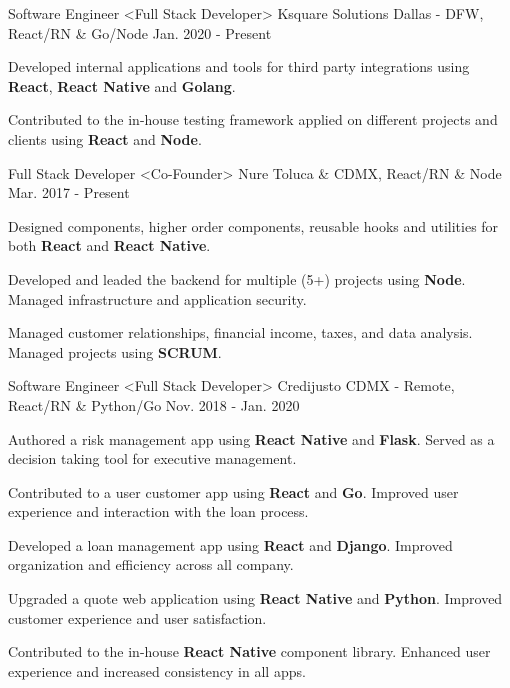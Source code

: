 \begin{cventries}
  \cventry
    {Software Engineer <Full Stack Developer>}
    {Ksquare Solutions}
    {Dallas - DFW, React/RN \& Go/Node}
    {Jan. 2020 - Present}
    {
      \begin{cvitems}
        \item {Developed internal applications and tools for third party integrations using \textbf{React}, \textbf{React Native} and \textbf{Golang}.}
        \item {Contributed to the in-house testing framework applied on different projects and clients using \textbf{React} and \textbf{Node}.}
      \end{cvitems}
    }
  \cventry
    {Full Stack Developer <Co-Founder>}
    {Nure}
    {Toluca \& CDMX, React/RN \& Node}
    {Mar. 2017 - Present}
    {
      \begin{cvitems}
        \item {Designed components, higher order components, reusable hooks and utilities for both \textbf{React} and \textbf{React Native}.}
        \item {Developed and leaded the backend for multiple (5+) projects using \textbf{Node}. Managed infrastructure and application security.}
         \item {Managed customer relationships, financial income, taxes, and data analysis. Managed projects using \textbf{SCRUM}.}
      \end{cvitems}
    }
  \cventry
    {Software Engineer <Full Stack Developer>}
    {Credijusto}
    {CDMX - Remote, React/RN \& Python/Go}
    {Nov. 2018 - Jan. 2020}
    {
      \begin{cvitems}
        \item {Authored a risk management app using \textbf{React Native} and \textbf{Flask}. Served as a decision taking tool for executive management.}
        \item {Contributed to a user customer app using \textbf{React} and \textbf{Go}. Improved user experience and interaction with the loan process.}
        \item {Developed a loan management app using \textbf{React} and \textbf{Django}. Improved organization and efficiency across all company.}
        \item {Upgraded a quote web application using \textbf{React Native} and \textbf{Python}. Improved customer experience and user satisfaction.}
        \item {Contributed to the in-house \textbf{React Native} component library. Enhanced user experience and increased consistency in all apps.}

\end{cvitems}}
\end{cventries}
